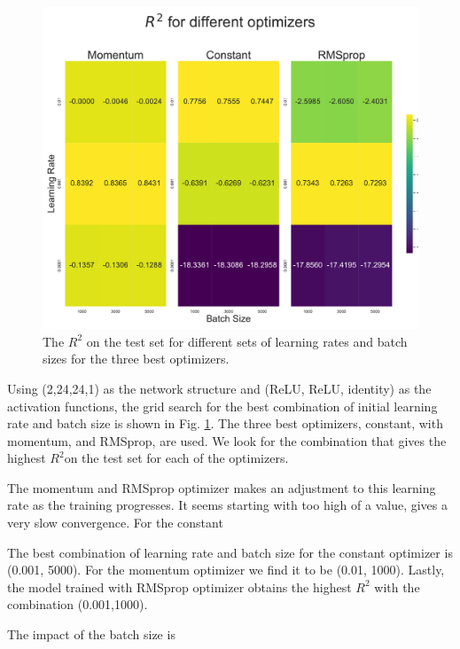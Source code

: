 \begin{figure}[h!]
    \centering
    \includegraphics[width=1.0\linewidth]{project_2/figures/$R^2$_grid_continuous.pdf}
    \caption{The $R^2$ on the test set for different sets of learning rates and batch sizes for the three best optimizers. }
    \label{fig:grid_franke}
\end{figure}

Using (2,24,24,1) as the network structure and (ReLU, ReLU, identity) as the activation functions, the grid search for the best combination of initial learning rate and batch size is shown in Fig. \ref{fig:grid_franke}. The three best optimizers, constant, with momentum, and RMSprop, are used. 
We look for the combination that gives the highest $R^2$on the test set for each of the optimizers. 

The momentum and RMSprop optimizer makes an adjustment to this learning rate as the training progresses. It seems starting with too high of a value, gives a very slow convergence. For the constant 

The best combination of learning rate and batch size for the constant optimizer is (0.001, 5000). For the momentum optimizer we find it to be (0.01, 1000). Lastly, the model trained with RMSprop optimizer obtains the highest $R^2$ with the combination (0.001,1000). 

The impact of the batch size is 


